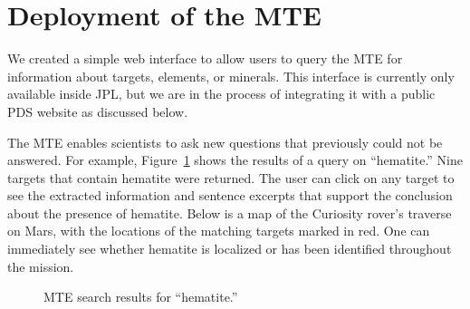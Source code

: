 \documentclass[letterpaper]{article} %
\begin{document}
\section{Deployment of the MTE}

We created a simple web interface to allow users to query the MTE for
information about targets, elements, or minerals.  This interface is
currently only available inside JPL, but we are in the process of
integrating it with a public PDS website as discussed below.

The MTE enables scientists to ask new questions that previously could
not be answered.  For example, Figure~\ref{fig:mtesearch} shows the
results of a query on ``hematite.''  Nine targets that contain
hematite were returned.  The user can click on any target to see the
extracted information and sentence excerpts that support the
conclusion about the presence of hematite.  Below is a map
of the Curiosity rover's traverse on Mars, with the locations of the
matching targets marked in red.  One can immediately see whether
hematite is localized or has been identified throughout the mission.

\begin{figure}
\begin{center}
\end{center}
\caption{MTE search results for “hematite.”}
\label{fig:mtesearch}
\end{figure}
\end{document}
